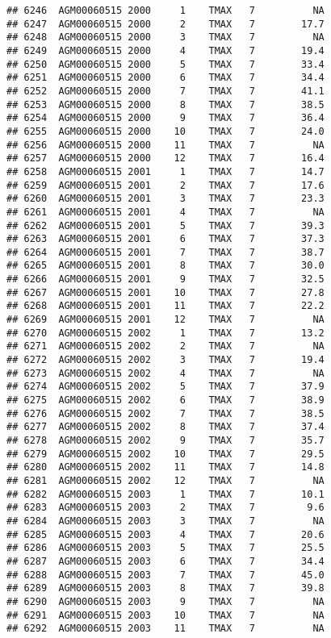 \documentclass{article}\usepackage[]{graphicx}\usepackage[]{color}
\makeatletter
\newenvironment{kframe}{%
 \def\at@end@of@kframe{}%
 \ifinner\ifhmode%
  \def\at@end@of@kframe{\end{minipage}}%
  \begin{minipage}{\columnwidth}%
 \fi\fi%
 \def\FrameCommand##1{\hskip\@totalleftmargin \hskip-\fboxsep
 \colorbox{shadecolor}{##1}\hskip-\fboxsep
     \hskip-\linewidth \hskip-\@totalleftmargin \hskip\columnwidth}%
 \MakeFramed {\advance\hsize-\width
   \@totalleftmargin\z@ \linewidth\hsize
   \@setminipage}}%
 {\par\unskip\endMakeFramed%
 \at@end@of@kframe}
\newenvironment{knitrout}{}{} %
\makeatother
\begin{document}
\begin{knitrout}
\begin{kframe}
\begin{verbatim}
## 6246  AGM00060515 2000     1    TMAX   7          NA
## 6247  AGM00060515 2000     2    TMAX   7        17.7
## 6248  AGM00060515 2000     3    TMAX   7          NA
## 6249  AGM00060515 2000     4    TMAX   7        19.4
## 6250  AGM00060515 2000     5    TMAX   7        33.4
## 6251  AGM00060515 2000     6    TMAX   7        34.4
## 6252  AGM00060515 2000     7    TMAX   7        41.1
## 6253  AGM00060515 2000     8    TMAX   7        38.5
## 6254  AGM00060515 2000     9    TMAX   7        36.4
## 6255  AGM00060515 2000    10    TMAX   7        24.0
## 6256  AGM00060515 2000    11    TMAX   7          NA
## 6257  AGM00060515 2000    12    TMAX   7        16.4
## 6258  AGM00060515 2001     1    TMAX   7        14.7
## 6259  AGM00060515 2001     2    TMAX   7        17.6
## 6260  AGM00060515 2001     3    TMAX   7        23.3
## 6261  AGM00060515 2001     4    TMAX   7          NA
## 6262  AGM00060515 2001     5    TMAX   7        39.3
## 6263  AGM00060515 2001     6    TMAX   7        37.3
## 6264  AGM00060515 2001     7    TMAX   7        38.7
## 6265  AGM00060515 2001     8    TMAX   7        30.0
## 6266  AGM00060515 2001     9    TMAX   7        32.5
## 6267  AGM00060515 2001    10    TMAX   7        27.8
## 6268  AGM00060515 2001    11    TMAX   7        22.2
## 6269  AGM00060515 2001    12    TMAX   7          NA
## 6270  AGM00060515 2002     1    TMAX   7        13.2
## 6271  AGM00060515 2002     2    TMAX   7          NA
## 6272  AGM00060515 2002     3    TMAX   7        19.4
## 6273  AGM00060515 2002     4    TMAX   7          NA
## 6274  AGM00060515 2002     5    TMAX   7        37.9
## 6275  AGM00060515 2002     6    TMAX   7        38.9
## 6276  AGM00060515 2002     7    TMAX   7        38.5
## 6277  AGM00060515 2002     8    TMAX   7        37.4
## 6278  AGM00060515 2002     9    TMAX   7        35.7
## 6279  AGM00060515 2002    10    TMAX   7        29.5
## 6280  AGM00060515 2002    11    TMAX   7        14.8
## 6281  AGM00060515 2002    12    TMAX   7          NA
## 6282  AGM00060515 2003     1    TMAX   7        10.1
## 6283  AGM00060515 2003     2    TMAX   7         9.6
## 6284  AGM00060515 2003     3    TMAX   7          NA
## 6285  AGM00060515 2003     4    TMAX   7        20.6
## 6286  AGM00060515 2003     5    TMAX   7        25.5
## 6287  AGM00060515 2003     6    TMAX   7        34.4
## 6288  AGM00060515 2003     7    TMAX   7        45.0
## 6289  AGM00060515 2003     8    TMAX   7        39.8
## 6290  AGM00060515 2003     9    TMAX   7          NA
## 6291  AGM00060515 2003    10    TMAX   7          NA
## 6292  AGM00060515 2003    11    TMAX   7          NA

\end{verbatim}
\end{kframe}
\end{knitrout}
\end{document}
